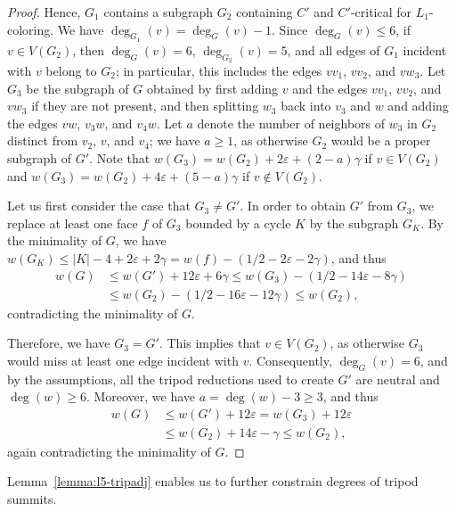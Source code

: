 \documentclass[12pt,twoside,openright,a4paper]{book}
\begin{document}
\begin{proof}
Hence, $G_1$ contains a subgraph $G_2$ containing $C'$ and $C'$-critical for $L_1$-coloring.
We have $\deg_{G_1}(v)=\deg_G(v)-1$.  Since $\deg_G(v)\le 6$,
if $v\in V(G_2)$, then $\deg_G(v)=6$, $\deg_{G_2}(v)=5$, and all edges of $G_1$ incident with $v$ belong to $G_2$;
in particular, this includes the edges $vv_1$, $vv_2$, and $vw_3$.  Let $G_3$ be the subgraph of $G$ obtained
by first adding $v$ and the edges $vv_1$, $vv_2$, and $vw_3$ if they are not present, and then splitting $w_3$ back into $v_3$
and $w$ and adding the edges $vw$, $v_3w$, and $v_4w$.  Let $a$ denote the number of neighbors of $w_3$ in $G_2$ distinct
from $v_2$, $v$, and $v_4$; we have $a\ge 1$, as otherwise $G_2$ would be a proper subgraph of $G'$.
Note that $w(G_3)=w(G_2)+2\varepsilon+(2-a)\gamma$ if $v\in V(G_2)$
and $w(G_3)=w(G_2)+4\varepsilon+(5-a)\gamma$ if $v\not\in V(G_2)$.

Let us first consider the case that $G_3\neq G'$.  In order to obtain $G'$ from $G_3$, we replace
at least one face $f$ of $G_3$ bounded by a cycle $K$ by the subgraph $G_K$.
By the minimality of $G$, we have $w(G_K)\le |K|-4+2\varepsilon+2\gamma=w(f)-(1/2-2\varepsilon-2\gamma)$,
and thus
\begin{align*}
w(G)&\le w(G')+12\varepsilon+6\gamma\le w(G_3)-(1/2-14\varepsilon-8\gamma)\\
&\le w(G_2)-(1/2-16\varepsilon-12\gamma)\le w(G_2),
\end{align*}
contradicting the minimality of $G$.

Therefore, we have $G_3=G'$.  This implies that $v\in V(G_2)$, as otherwise $G_3$ would miss at least one edge incident with $v$.
Consequently, $\deg_G(v)=6$, and by the assumptions, all the tripod reductions used to create $G'$ are neutral and $\deg(w)\ge 6$.
Moreover, we have $a=\deg(w)-3\ge 3$, and thus
\begin{align*}
w(G)&\le w(G')+12\varepsilon=w(G_3)+12\varepsilon\\
&\le w(G_2)+14\varepsilon-\gamma\le w(G_2),
\end{align*}
again contradicting the minimality of $G$.
\end{proof}

Lemma~\ref{lemma:l5-tripadj} enables us to further constrain degrees of tripod summits.
\end{document}
